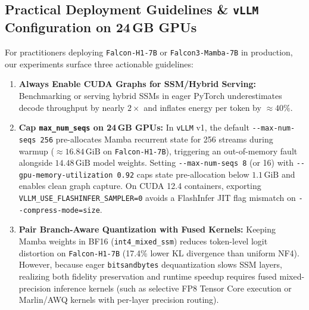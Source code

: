 \documentclass[10pt,a4paper]{article}
\begin{document}
\subsection{Practical Deployment Guidelines \& \texttt{vLLM} Configuration on \texorpdfstring{24\,GB}{24 GB} GPUs}
For practitioners deploying \texttt{Falcon-H1-7B} or \texttt{Falcon3-Mamba-7B} in production, our experiments surface three actionable guidelines:
\begin{enumerate}[leftmargin=1.5em,itemsep=1.5pt,topsep=2.5pt,parsep=0pt]
    \item \textbf{Always Enable CUDA Graphs for SSM/Hybrid Serving:} Benchmarking or serving hybrid SSMs in eager PyTorch underestimates decode throughput by nearly $2\times$ and inflates energy per token by $\approx 40\%$.
    \item \textbf{Cap \texttt{max\_num\_seqs} on \texorpdfstring{24\,GB}{24 GB} GPUs:} In \texttt{vLLM} v1, the default \texttt{-{}-max-num-seqs 256} pre-allocates Mamba recurrent state for 256 streams during warmup ($\approx 16.84\,\text{GiB}$ on \texttt{Falcon-H1-7B}), triggering an out-of-memory fault alongside $14.48\,\text{GiB}$ model weights. Setting \texttt{-{}-max-num-seqs 8} (or 16) with \texttt{-{}-gpu-memory-utilization 0.92} caps state pre-allocation below $1.1\,\text{GiB}$ and enables clean graph capture. On CUDA 12.4 containers, exporting \texttt{VLLM\_USE\_FLASHINFER\_SAMPLER=0} avoids a FlashInfer JIT flag mismatch on \mbox{\texttt{-{}-compress-mode=size}}.
    \item \textbf{Pair Branch-Aware Quantization with Fused Kernels:} Keeping Mamba weights in BF16 (\mbox{\texttt{int4\_mixed\_ssm}}) reduces token-level logit distortion on \texttt{Falcon-H1-7B} (17.4\% lower KL divergence than uniform NF4). However, because eager \texttt{bitsandbytes} dequantization slows SSM layers, realizing both fidelity preservation and runtime speedup requires fused mixed-precision inference kernels (such as selective FP8 Tensor Core execution or Marlin/AWQ kernels with per-layer precision routing).
\end{enumerate}
\end{document}

